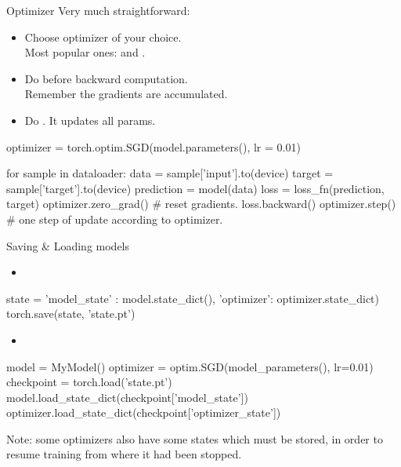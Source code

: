 \begin{frame}[fragile]{Optimizer}
\vspace{-3mm}
Very much straightforward:
\begin{itemize}
\item Choose optimizer of your choice.\\
Most popular ones:  and .
\item Do  before backward computation.\\
Remember the gradients are accumulated.
\item Do . It updates all params.
\end{itemize}
\begin{python}
optimizer = torch.optim.SGD(model.parameters(), lr = 0.01)

for sample in dataloader:
    data = sample['input'].to(device)
    target = sample['target'].to(device)
    prediction = model(data)
    loss = loss_fn(prediction, target)
    optimizer.zero_grad()  # reset gradients.
    loss.backward()
    optimizer.step()  # one step of update according to optimizer.
\end{python}
\end{frame}

\begin{frame}[fragile]{Saving \& Loading models}
\begin{itemize}
\item {}
\end{itemize}
\begin{python}
state = {'model_state' : model.state_dict(),
         'optimizer': optimizer.state_dict)}
torch.save(state, 'state.pt')
\end{python}
\vsp
\begin{itemize}
\item {}
\end{itemize}
\begin{python}
model = MyModel()
optimizer = optim.SGD(model_parameters(), lr=0.01)
checkpoint = torch.load('state.pt')
model.load_state_dict(checkpoint['model_state'])
optimizer.load_state_dict(checkpoint['optimizer_state'])
\end{python}
\vsp
Note: some optimizers also have some states which
must be stored, in order to resume training from
where it had been stopped. 
\end{frame}

